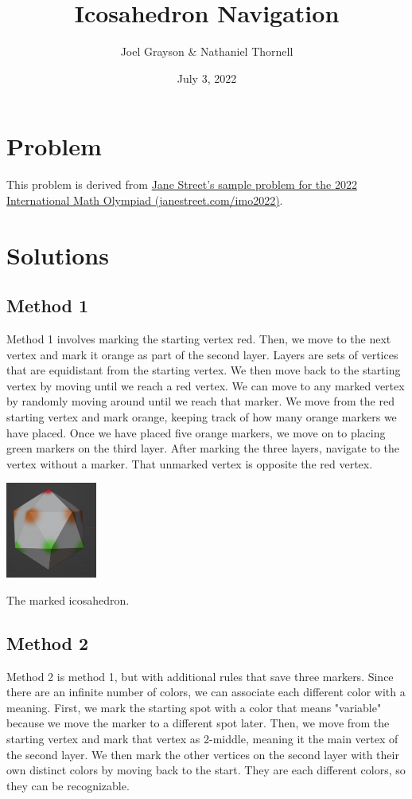 \documentclass{article}
\title{Icosahedron Navigation}
\author{Joel Grayson \& Nathaniel Thornell}
\date{July 3, 2022}
\begin{document}
\maketitle

\section{Problem}
This problem is derived from \href{https://www.janestreet.com/imo2022/}{Jane Street's sample problem for the 2022 International Math Olympiad (janestreet.com/imo2022)}.



\section{Solutions}
\subsection{Method 1}
Method 1 involves marking the starting vertex red. Then, we move to the next vertex and mark it orange as part of the second layer. Layers are sets of vertices that are equidistant from the starting vertex. We then move back to the starting vertex by moving until we reach a red vertex. We can move to any marked vertex by randomly moving around until we reach that marker. We move from the red starting vertex and mark orange, keeping track of how many orange markers we have placed. Once we have placed five orange markers, we move on to placing green markers on the third layer. After marking the three layers, navigate to the vertex without a marker. That unmarked vertex is opposite the red vertex.

\includegraphics[width=3cm]{model1.jpg}
\caption{The marked icosahedron.}


\subsection{Method 2}
Method 2 is method 1, but with additional rules that save three markers. Since there are an infinite number of colors, we can associate each different color with a meaning. First, we mark the starting spot with a color that means "variable" because we move the marker to a different spot later. Then, we move from the starting vertex and mark that vertex as 2-middle, meaning it the main vertex of the second layer. We then mark the other vertices on the second layer with their own distinct colors by moving back to the start. They are each different colors, so they can be recognizable.
\end{document}
